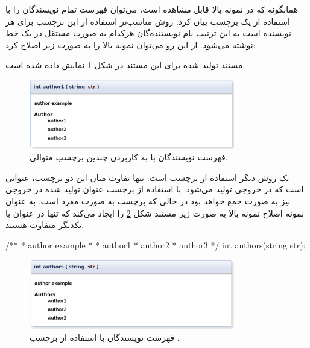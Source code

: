 همانگونه که در نمونه بالا قابل مشاهده است، می‌توان فهرست تمام نویسندگان را با
استفاده از یک برچسب بیان کرد.
روش مناسب‌تر استفاده از این برچسب برای هر نویسنده است به این ترتیب نام
نویستنده‌گان هرکدام به صورت مستقل در یک خط نوشته می‌شود.
از این رو می‌توان نمونه بالا را به صورت زیر اصلاح کرد:
مستند تولید شده برای این مستند در شکل \ref{write/document-the-code/developer-info/author-multi1}
نمایش داده شده است.
\begin{figure}
	\centering
	\includegraphics[width=0.8\textwidth]{image/write/document-the-code/developer-info/author-multi1}
	\caption[فهرست نویسندگان]{
		فهرست نویسندگان با به کاربردن چندین برچسب متوالی.
	}
	\label{write/document-the-code/developer-info/author-multi1}
\end{figure}

یک روش دیگر استفاده از برچسب  است.
تنها تفاوت میان این دو برچسب، عنوانی است که در خروجی تولید می‌شود.
با استفاده از برچسب  عنوان تولید شده در خروجی نیز به صورت جمع خواهد
بود در حالی که برچسب  به صورت مفرد است.
به عنوان نمونه اصلاح نمونه بالا به صورت زیر مستند شکل
\ref{write/document-the-code/developer-info/author-multi2} را ایجاد می‌کند که
تنها در عنوان با یکدیگر متفاوت هستند.
\begin{C++}
/**
 * \brief author example
 *
 * \authors author1
 * \authors author2
 * \authors author3
 */
int authors(string str);
\end{C++}
\begin{figure}
	\centering
	\includegraphics[width=0.8\textwidth]{image/write/document-the-code/developer-info/author-multi2}
	\caption[فهرست نویسندگان]{
		فهرست نویسندگان با استفاده از برچسب .
	}
	\label{write/document-the-code/developer-info/author-multi2}
\end{figure}


